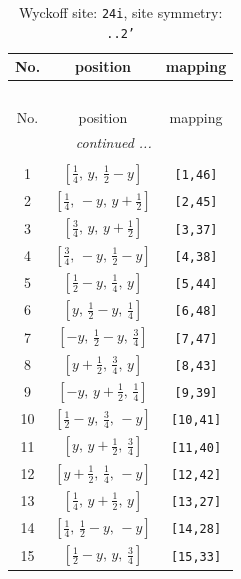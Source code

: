 \documentclass[fleqn,8pt]{jsarticle}
\begin{document}
\begin{longtable}{ccc}
\caption{Wyckoff site: {\tt 24i}, site symmetry: {\tt ..2'}}
 \\
 \hline \hline
No. & position & mapping \\ \hline \endfirsthead

\multicolumn{2}{l}{\tablename\ \thetable{}} \\
 \hline \hline
No. & position & mapping \\ \hline \endhead

 \hline \hline
\multicolumn{2}{r}{\footnotesize\it continued ...} \\ \endfoot

 \hline \hline
\multicolumn{2}{r}{} \\ \endlastfoot

1 & $\left[ \frac{1}{4},\, y,\, \frac{1}{2} - y \right]$ & {\tt [1,46]} \\ \hline
2 & $\left[ \frac{1}{4},\, - y,\, y + \frac{1}{2} \right]$ & {\tt [2,45]} \\ \hline
3 & $\left[ \frac{3}{4},\, y,\, y + \frac{1}{2} \right]$ & {\tt [3,37]} \\ \hline
4 & $\left[ \frac{3}{4},\, - y,\, \frac{1}{2} - y \right]$ & {\tt [4,38]} \\ \hline
5 & $\left[ \frac{1}{2} - y,\, \frac{1}{4},\, y \right]$ & {\tt [5,44]} \\ \hline
6 & $\left[ y,\, \frac{1}{2} - y,\, \frac{1}{4} \right]$ & {\tt [6,48]} \\ \hline
7 & $\left[ - y,\, \frac{1}{2} - y,\, \frac{3}{4} \right]$ & {\tt [7,47]} \\ \hline
8 & $\left[ y + \frac{1}{2},\, \frac{3}{4},\, y \right]$ & {\tt [8,43]} \\ \hline
9 & $\left[ - y,\, y + \frac{1}{2},\, \frac{1}{4} \right]$ & {\tt [9,39]} \\ \hline
10 & $\left[ \frac{1}{2} - y,\, \frac{3}{4},\, - y \right]$ & {\tt [10,41]} \\ \hline
11 & $\left[ y,\, y + \frac{1}{2},\, \frac{3}{4} \right]$ & {\tt [11,40]} \\ \hline
12 & $\left[ y + \frac{1}{2},\, \frac{1}{4},\, - y \right]$ & {\tt [12,42]} \\ \hline
13 & $\left[ \frac{1}{4},\, y + \frac{1}{2},\, y \right]$ & {\tt [13,27]} \\ \hline
14 & $\left[ \frac{1}{4},\, \frac{1}{2} - y,\, - y \right]$ & {\tt [14,28]} \\ \hline
15 & $\left[ \frac{1}{2} - y,\, y,\, \frac{3}{4} \right]$ & {\tt [15,33]} \\ \hline

\end{longtable}
\end{document}
